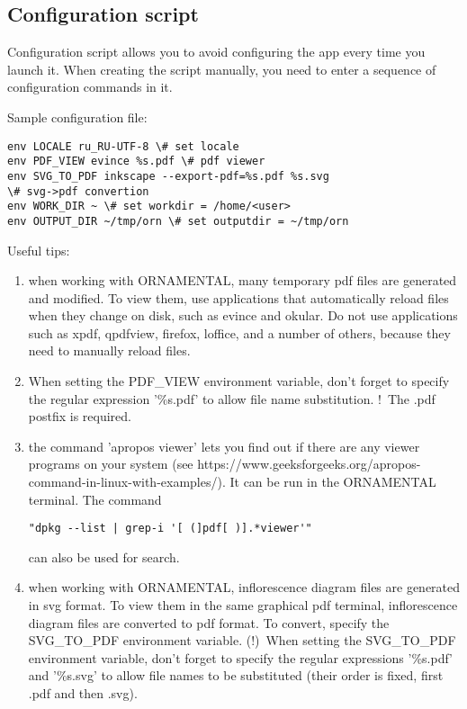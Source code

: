 \documentclass[a4paper]{article}
\begin{document}
\subsection{Configuration script \label{init}}

Configuration script allows you to avoid configuring the app every time you launch it. When creating the script manually, you need to enter a sequence of configuration commands in it.

Sample configuration file:
\begin{lstlisting}
env LOCALE ru_RU-UTF-8 \# set locale
env PDF_VIEW evince %s.pdf \# pdf viewer
env SVG_TO_PDF inkscape --export-pdf=%s.pdf %s.svg 
\# svg->pdf convertion
env WORK_DIR ~ \# set workdir = /home/<user>
env OUTPUT_DIR ~/tmp/orn \# set outputdir = ~/tmp/orn
\end{lstlisting}

Useful tips:
\begin{enumerate}
\item when working with ORNAMENTAL, many temporary pdf files are generated and modified. To view them, use applications that automatically reload files when they change on disk, such as evince and okular. Do not use applications such as xpdf, qpdfview, firefox, loffice, and a number of others, because they need to manually reload files.
\item When setting the PDF\_VIEW environment variable, don't forget to specify the regular expression '\%s.pdf' to allow file name substitution. !~The .pdf postfix is required.
\item the command 'apropos viewer' lets you find out if there are any viewer programs on your system (see https://www.geeksforgeeks.org/apropos-command-in-linux-with-examples/). It can be run in the ORNAMENTAL terminal. The command
\begin{lstlisting}
"dpkg --list | grep-i '[ (]pdf[ )].*viewer'" 
\end{lstlisting}
can also be used for search.
\item when working with ORNAMENTAL, inflorescence diagram files are generated in svg format. To view them in the same graphical pdf terminal, inflorescence diagram files are converted to pdf format. To convert, specify the SVG\_TO\_PDF environment variable. (!)~When setting the SVG\_TO\_PDF environment variable, don't forget to specify the regular expressions '\%s.pdf' and '\%s.svg' to allow file names to be substituted (their order is fixed, first .pdf and then .svg).
\end{enumerate}
\end{document}
